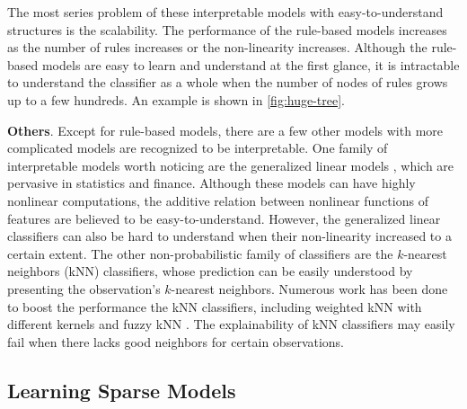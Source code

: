 The most series problem of these interpretable models with easy-to-understand structures is the scalability. The performance of the rule-based models increases as the number of rules increases or the non-linearity increases. Although the rule-based models are easy to learn and understand at the first glance, it is intractable to understand the classifier as a whole when the number of nodes of rules grows up to a few hundreds. An example is shown in \autoref{fig:huge-tree}.

\textbf{Others}. Except for rule-based models, there are a few other models with more complicated models are recognized to be interpretable.
One family of interpretable models worth noticing are the generalized linear models \cite{debock2010gam}, which are pervasive in statistics and finance. Although these models can have highly nonlinear computations, the additive relation between nonlinear functions of features are believed to be easy-to-understand. However, the generalized linear classifiers can also be hard to understand when their non-linearity increased to a certain extent. The other non-probabilistic family of classifiers are the $k$-nearest neighbors (kNN) classifiers, whose prediction can be easily understood by presenting the observation's $k$-nearest neighbors. Numerous work has been done to boost the performance the kNN classifiers, including weighted kNN with different kernels \cite{dudani1976weightedknn} and fuzzy kNN \cite{keller1985fuzzyknn}. The explainability of kNN classifiers may easily fail when there lacks good neighbors for certain observations.







\subsection{Learning Sparse Models}

